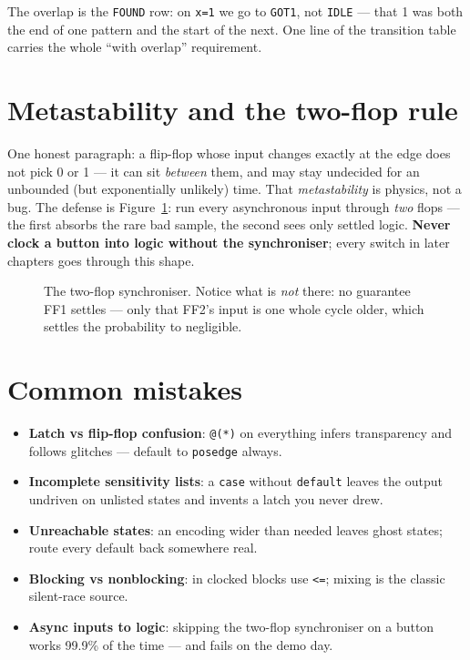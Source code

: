 The overlap is the \texttt{FOUND} row: on \texttt{x=1} we go to
\texttt{GOT1}, not \texttt{IDLE} — that 1 was both the end of one
pattern and the start of the next. One line of the transition table
carries the whole ``with overlap'' requirement.

\section{Metastability and the two-flop rule}
\label{sec:meta}

One honest paragraph: a flip-flop whose input changes exactly at the
edge does not pick 0 or 1 — it can sit \emph{between} them, and may
stay undecided for an unbounded (but exponentially unlikely) time.
That \emph{metastability} is physics, not a bug.
The defense is Figure~\ref{fig:sync}: run every asynchronous input
through \emph{two} flops — the first absorbs the rare bad sample, the
second sees only settled logic. \textbf{Never clock a button into
logic without the synchroniser}; every switch in later chapters goes
through this shape.

\begin{figure}[htbp]
\centering

\caption{The two-flop synchroniser. Notice what is \emph{not} there:
no guarantee FF1 settles — only that FF2's input is one whole cycle
older, which settles the probability to negligible.}
\label{fig:sync}
\end{figure}

\section{Common mistakes}
\label{sec:mistakes10}

\begin{itemize}
\item \textbf{Latch vs flip-flop confusion}: \texttt{@(*)} on
everything infers transparency and follows glitches — default to
\texttt{posedge} always.
\item \textbf{Incomplete sensitivity lists}: a \texttt{case} without
\texttt{default} leaves the output undriven on unlisted states and
invents a latch you never drew.
\item \textbf{Unreachable states}: an encoding wider than needed
leaves ghost states; route every default back somewhere real.
\item \textbf{Blocking vs nonblocking}: in clocked blocks use
\texttt{<=}; mixing is the classic silent-race source.
\item \textbf{Async inputs to logic}: skipping the two-flop
synchroniser on a button works 99.9\% of the time — and fails on the
demo day.
\end{itemize}

